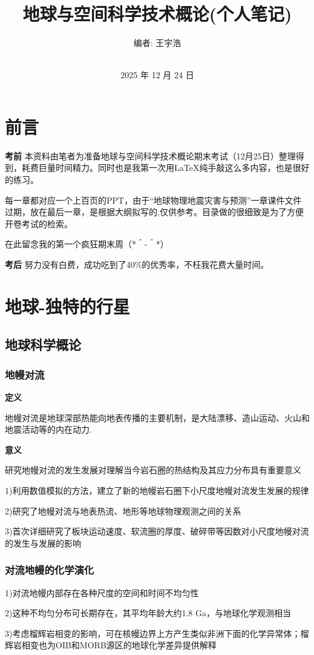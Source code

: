 \documentclass[12pt,a4paper]{article}
\title{地球与空间科学技术概论(个人笔记)}
\author{编者: 王宇浩\\ \text{PB2507****} \\ \text{中国科学技术大学地空学院}}
\date{2025 年 12 月 24 日}
\begin{document}
	\maketitle
	\section*{前言}
	\textbf{考前} 本资料由笔者为准备地球与空间科学技术概论期末考试（12月25日）整理得到，耗费巨量时间精力。同时也是我第一次用\LaTeX 纯手敲这么多内容，也是很好的练习。
	
	每一章都对应一个上百页的PPT，由于“地球物理地震灾害与预测”一章课件文件过期，放在最后一章，是根据大纲拟写的,仅供参考。目录做的很细致是为了方便开卷考试的检索。
	
	在此留念我的第一个疯狂期末周（*＾-＾*）
	
	\textbf{考后} 努力没有白费，成功吃到了40\%的优秀率，不枉我花费大量时间。
	\tableofcontents
	\newpage
	\section{地球-独特的行星}
	\subsection{地球科学概论}
	\subsubsection{地幔对流}
	\textbf{定义}
	
	地幔对流是地球深部热能向地表传播的主要机制，是大陆漂移、造山运动、火山和地震活动等的内在动力.
	
	\textbf{意义}
	
	研究地幔对流的发生发展对理解当今岩石圈的热结构及其应力分布具有重要意义
	
	1)利用数值模拟的方法，建立了新的地幔岩石圈下小尺度地幔对流发生发展的规律
	
	2)研究了地幔对流与地表热流、地形等地球物理观测之间的关系
	
	3)首次详细研究了板块运动速度、软流圈的厚度、破碎带等因数对小尺度地幔对流的发生与发展的影响
	\subsubsection{对流地幔的化学演化}
	1)对流地幔内部存在各种尺度的空间和时间不均匀性
	
	2)这种不均匀分布可长期存在，其平均年龄大约1.8 Ga，与地球化学观测相当
	
	3)考虑榴辉岩相变的影响，可在核幔边界上方产生类似非洲下面的化学异常体；榴辉岩相变也为OIB和MORB源区的地球化学差异提供解释
	
\end{document}
